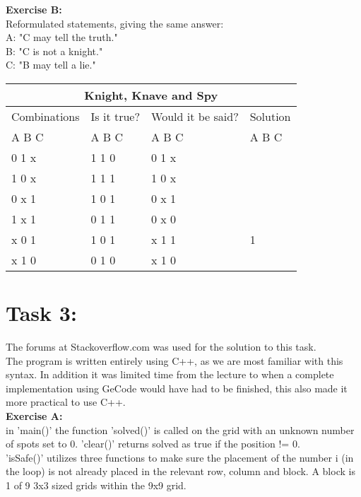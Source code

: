 \documentclass[11pt]{amsart}
\begin{document}
\textbf{Exercise B:} \\
Reformulated statements, giving the same answer:\\

	A: "C may tell the truth."\\
	B: "C is not a knight."\\
	C: "B may tell a lie." \\


\begin{tabular}{ |p{3cm}||p{3cm}|p{3cm}|p{3cm}|  }
	\hline
	\multicolumn{4}{|c|}{Knight, Knave and Spy} \\
	\hline
	 Combinations & Is it true? & Would it be said? & Solution  \\ A  B  C   &   A  B  C  &   A  B  C & A  B  C \\
	\hline
	  0   1   x  	& 1	1	0   & 0 1 x	&  \\
	  1   0   x		& 1	1	1  	& 1 0 x &  \\
	  0   x   1 	&	1	0	1 	& 0 x 1	&  \\
	  1   x   1  	&	0	1	1 	& 0 x 0	&  \\
	  x   0   1		& 1	0	1  	& x 1 1	& 1\\
	  x   1   0		& 0	1	0  	& x 1 0 &  \\

	\hline
\end{tabular}


\section{Task 3:}

The forums at Stackoverflow.com was used for the solution to this task. \\

The program is written entirely using C++, as we are most familiar with this syntax.
In addition it was limited time from the lecture to when a complete
implementation using GeCode would have had to be finished, this also made it more practical to use C++. \\

\textbf{Exercise A:} \\

in 'main()' the function 'solved()' is called on the grid with an unknown number of
spots set to 0. 'clear()' returns solved as true if the position != 0. \\
'isSafe()' utilizes three functions to make sure the placement of the number i (in the loop) is
not already placed in the relevant row, column and block. A block is 1 of 9 3x3 sized grids within
the 9x9 grid. \\
\end{document}
